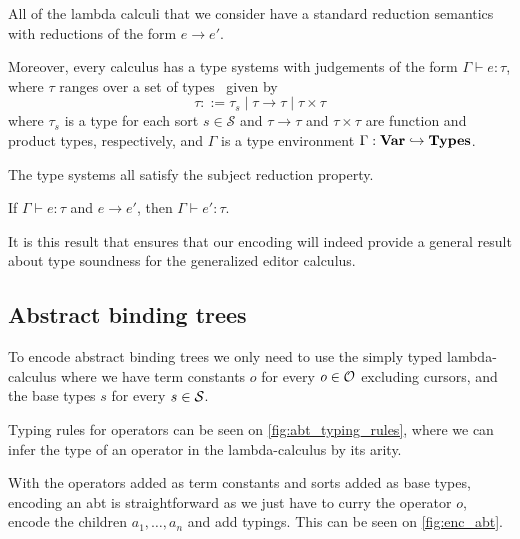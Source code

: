 \documentclass[sigplan,review]{acmart}
\newcommand{\abt}{\textsf{abt}\xspace}
\begin{document}
 All of the lambda calculi that we consider have a
 standard reduction semantics with reductions of the form $e \to
 e'$.

 Moreover, every calculus has a type systems with judgements of the
 form $\Gamma \vdash e : \tau$, where $\tau$ ranges over a set of
 types \Types\ given by
%
\[  \tau ::= \tau_s \mid \tau \to \tau \mid \tau \times \tau  \]
%
where $\tau_s$ is a type for each sort $s \in \mathcal{S}$ and $\tau
\to \tau$ and $\tau \times \tau$ are function and product types,
respectively, and $\Gamma$ is a type environment
 $\Gamma : \textbf{Var} \hookrightarrow \textbf{Types}$. 

 The type systems all satisfy the subject
 reduction property.

 \begin{theorem}\label{thm:subred}
   If $\Gamma \vdash e : \tau$ and $e \to e'$, then $\Gamma \vdash e'
   : \tau$.
 \end{theorem}

 It is this result that ensures that our encoding will indeed provide
 a general result about type soundness for the generalized editor
 calculus.
 
\subsection{Abstract binding trees}

To encode abstract binding trees we only need to use the simply typed
lambda-calculus where we have term constants $o$ for every $o \in \mathcal{O}$
excluding cursors, and the base types $s$ for every $s \in \mathcal{S}$.

Typing rules for operators can be seen on \cref{fig:abt_typing_rules},
where we can infer the type of an operator in the lambda-calculus by
its arity.  

With the operators added as term constants and sorts added as base
types, encoding an {\abt} is straightforward as we just have to curry the
operator $o$, encode the children $a_1, \dots, a_n$ and add
typings. This can be seen on \cref{fig:enc_abt}. 

\end{document}
